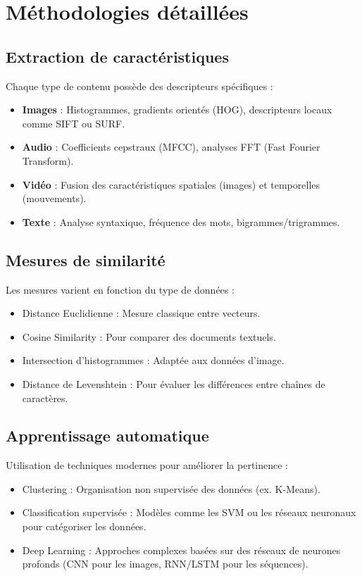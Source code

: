 \begin{section}
\section{Méthodologies détaillées}
\subsection{ Extraction de caractéristiques}
Chaque type de contenu possède des descripteurs spécifiques :
\begin{itemize}
    \item \textbf{Images} : Histogrammes, gradients orientés (HOG), descripteurs locaux comme SIFT ou SURF.
    \item \textbf{Audio} : Coefficients cepstraux (MFCC), analyses FFT (Fast Fourier Transform).
    \item \textbf{Vidéo} : Fusion des caractéristiques spatiales (images) et temporelles (mouvements).
    \item \textbf{Texte} : Analyse syntaxique, fréquence des mots, bigrammes/trigrammes.
\end{itemize}

\subsection{Mesures de similarité}
Les mesures varient en fonction du type de données :
\begin{itemize}
    \item Distance Euclidienne : Mesure classique entre vecteurs.
    \item Cosine Similarity : Pour comparer des documents textuels.
    \item Intersection d’histogrammes : Adaptée aux données d’image.
    \item Distance de Levenshtein : Pour évaluer les différences entre chaînes de caractères.
\end{itemize}

\subsection{Apprentissage automatique}
Utilisation de techniques modernes pour améliorer la pertinence :
\begin{itemize}
    \item Clustering : Organisation non supervisée des données (ex. K-Means).
    \item Classification supervisée : Modèles comme les SVM ou les réseaux neuronaux pour catégoriser les données.
    \item Deep Learning : Approches complexes basées sur des réseaux de neurones profonds (CNN pour les images, RNN/LSTM pour les séquences).
\end{itemize}


\end{section}
